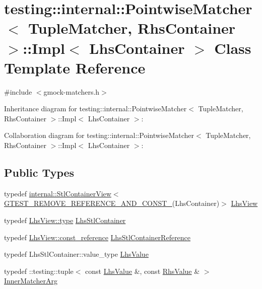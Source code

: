 \hypertarget{classtesting_1_1internal_1_1_pointwise_matcher_1_1_impl}{}\section{testing\+:\+:internal\+:\+:Pointwise\+Matcher$<$ Tuple\+Matcher, Rhs\+Container $>$\+:\+:Impl$<$ Lhs\+Container $>$ Class Template Reference}
\label{classtesting_1_1internal_1_1_pointwise_matcher_1_1_impl}


{\ttfamily \#include $<$gmock-\/matchers.\+h$>$}



Inheritance diagram for testing\+:\+:internal\+:\+:Pointwise\+Matcher$<$ Tuple\+Matcher, Rhs\+Container $>$\+:\+:Impl$<$ Lhs\+Container $>$\+:


Collaboration diagram for testing\+:\+:internal\+:\+:Pointwise\+Matcher$<$ Tuple\+Matcher, Rhs\+Container $>$\+:\+:Impl$<$ Lhs\+Container $>$\+:
\subsection*{Public Types}
\begin{DoxyCompactItemize}
\item 
typedef \hyperlink{classtesting_1_1internal_1_1_stl_container_view}{internal\+::\+Stl\+Container\+View}$<$ \hyperlink{gtest-internal_8h_a874567b176266188fabfffb8393267ce}{G\+T\+E\+S\+T\+\_\+\+R\+E\+M\+O\+V\+E\+\_\+\+R\+E\+F\+E\+R\+E\+N\+C\+E\+\_\+\+A\+N\+D\+\_\+\+C\+O\+N\+S\+T\+\_\+}(Lhs\+Container)$>$ \hyperlink{classtesting_1_1internal_1_1_pointwise_matcher_1_1_impl_a5240abc710bb0a5bedfd180bf6701fae}{Lhs\+View}
\item 
typedef \hyperlink{classtesting_1_1internal_1_1_stl_container_view_a2b2c63a6dcdbfe63fb0ee121ebf463ba}{Lhs\+View\+::type} \hyperlink{classtesting_1_1internal_1_1_pointwise_matcher_1_1_impl_a23420b57b4cd6d83cec8afda746c27f2}{Lhs\+Stl\+Container}
\item 
typedef \hyperlink{classtesting_1_1internal_1_1_stl_container_view_a9cd4f6ed689b3938cdb7b3c4cbf1b36b}{Lhs\+View\+::const\+\_\+reference} \hyperlink{classtesting_1_1internal_1_1_pointwise_matcher_1_1_impl_a9df3eb0866f76d59dbdd35fafeb5590c}{Lhs\+Stl\+Container\+Reference}
\item 
typedef Lhs\+Stl\+Container\+::value\+\_\+type \hyperlink{classtesting_1_1internal_1_1_pointwise_matcher_1_1_impl_a453769e721f4212e399f76c980b4b65c}{Lhs\+Value}
\item 
typedef \+::testing\+::tuple$<$ const \hyperlink{classtesting_1_1internal_1_1_pointwise_matcher_1_1_impl_a453769e721f4212e399f76c980b4b65c}{Lhs\+Value} \&, const \hyperlink{classtesting_1_1internal_1_1_pointwise_matcher_a9f7f1abbfa795033e1e1c1df385b4617}{Rhs\+Value} \& $>$ \hyperlink{classtesting_1_1internal_1_1_pointwise_matcher_1_1_impl_aba9d983881cbfbb37724b8b40e863898}{Inner\+Matcher\+Arg}
\end{DoxyCompactItemize}
